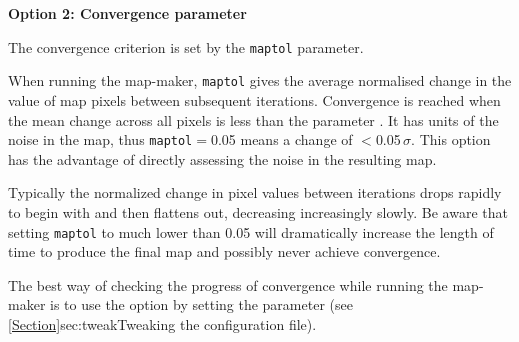 \documentclass[11pt,oneside,chapters]{starlink}
\begin{document}
\textbf{Option 2: Convergence parameter}

The convergence criterion is set by the \texttt{maptol} parameter.

When running the map-maker, \texttt{maptol} gives the average
normalised change in the value of map pixels
between subsequent iterations. Convergence is reached when the  mean
change across all pixels is less than the parameter .
It has units of the noise
in the map, thus \texttt{maptol}$=$0.05 means a change of
$<$0.05\,$\sigma$. This option has the advantage of directly assessing
the noise in the resulting map.

Typically the normalized change in pixel values between iterations
drops rapidly to begin with and then flattens out, decreasing
increasingly slowly.  Be aware that setting \texttt{maptol} to much
lower than 0.05 will dramatically increase the length of time to
produce the final map and possibly never achieve convergence.

The best way of checking the progress of convergence while running the
map-maker is to use the  option by setting the parameter
 (see \cref{Section}{sec:tweak}{Tweaking the
configuration file}).
\end{document}
